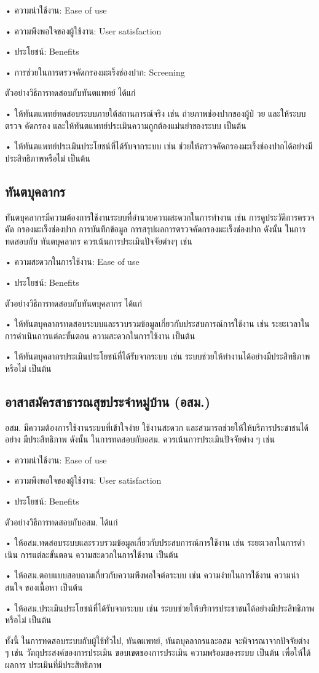 • ความน่าใช้งาน: Ease of use

• ความพึงพอใจของผู้ใช้งาน: User satisfaction

• ประโยชน์: Benefits

• การช่วยในการตรวจคัดกรองมะเร็งช่องปาก: Screening

ตัวอย่างวิธีการทดสอบกับทันตแพทย์ ได้แก่

• ให้ทันตแพทย์ทดสอบระบบภายใต้สถานการณ์จริง เช่น ถ่ายภาพช่องปากของผู้ป่ วย และให้ระบบตรวจ
คัดกรอง และให้ทันตแพทย์ประเมินความถูกต้องแม่นยําของระบบ เป็นต้น

• ให้ทันตแพทย์ประเมินประโยชน์ที่ได้รับจากระบบ เช่น ช่วยให้ตรวจคัดกรองมะเร็งช่องปากได้อย่างมี
ประสิทธิภาพหรือไม่ เป็นต้น

\subsection{ทันตบุคลากร}

ทันตบุคลากรมีความต้องการใช้งานระบบที่อํานวยความสะดวกในการทํางาน เช่น การดูประวัติการตรวจคัด
กรองมะเร็งช่องปาก การบันทึกข้อมูล การสรุปผลการตรวจคัดกรองมะเร็งช่องปาก ดังนั้น ในการทดสอบกับ
ทันตบุคลากร ควรเน้นการประเมินปัจจัยต่างๆ เช่น

• ความสะดวกในการใช้งาน: Ease of use

• ประโยชน์: Benefits

ตัวอย่างวิธีการทดสอบกับทันตบุคลากร ได้แก่

• ให้ทันตบุคลากรทดสอบระบบและรวบรวมข้อมูลเกี่ยวกับประสบการณ์การใช้งาน เช่น ระยะเวลาใน
การดําเนินการแต่ละขั้นตอน ความสะดวกในการใช้งาน เป็นต้น

• ให้ทันตบุคลากรประเมินประโยชน์ที่ได้รับจากระบบ เช่น ระบบช่วยให้ทํางานได้อย่างมีประสิทธิภาพ
หรือไม่ เป็นต้น

\subsection{อาสาสมัครสาธารณสุขประจําหมู่บ้าน (อสม.)}
อสม. มีความต้องการใช้งานระบบที่เข้าใจง่าย ใช้งานสะดวก และสามารถช่วยให้ให้บริการประชาชนได้อย่าง
มีประสิทธิภาพ ดังนั้น ในการทดสอบกับอสม. ควรเน้นการประเมินปัจจัยต่าง ๆ เช่น

• ความน่าใช้งาน: Ease of use

• ความพึงพอใจของผู้ใช้งาน: User satisfaction

• ประโยชน์: Benefits

ตัวอย่างวิธีการทดสอบกับอสม. ได้แก่


• ให้อสม.ทดสอบระบบและรวบรวมข้อมูลเกี่ยวกับประสบการณ์การใช้งาน เช่น ระยะเวลาในการดําเนิน
การแต่ละขั้นตอน ความสะดวกในการใช้งาน เป็นต้น

• ให้อสม.ตอบแบบสอบถามเกี่ยวกับความพึงพอใจต่อระบบ เช่น ความง่ายในการใช้งาน ความน่าสนใจ
ของเนื้อหา เป็นต้น

• ให้อสม.ประเมินประโยชน์ที่ได้รับจากระบบ เช่น ระบบช่วยให้บริการประชาชนได้อย่างมีประสิทธิภาพหรือไม่ เป็นต้น

ทั้งนี้ ในการทดสอบระบบกับผู้ใช้ทั่วไป, ทันตแพทย์, ทันตบุคลากรและอสม จะพิจารณาจากปัจจัยต่าง ๆ
เช่น วัตถุประสงค์ของการประเมิน ขอบเขตของการประเมิน ความพร้อมของระบบ เป็นต้น เพื่อให้ได้ผลการ
ประเมินที่มีประสิทธิภาพ